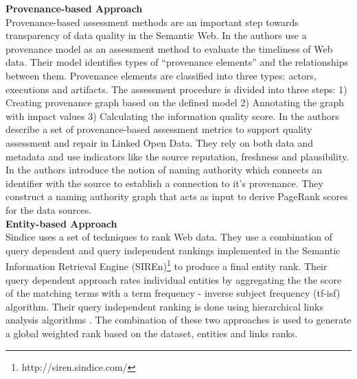 \documentclass[onecolumn, crcready]{iosart2c}
\begin{document}
{\bf Provenance-based Approach}\\

Provenance-based assessment methods are an important step towards transparency of data quality in the Semantic Web. In \cite{Hartig09usingweb} the authors use a provenance model as an assessment method to evaluate the timeliness of Web data. Their model identifies types of ``provenance elements'' and the relationships between them. Provenance elements are classified into three types: actors, executions and artifacts. The assessment procedure is divided into three steps: 1) Creating provenance graph based on the defined model 2) Annotating the graph with impact values 3) Calculating the information quality score. In \cite{Flouris2012} the authors describe a set of provenance-based assessment metrics to support quality assessment and repair in Linked Open Data. They rely on both data and metadata and use indicators like the source reputation, freshness and plausibility. In \cite{Harth2009} the authors introduce the notion of naming authority which connects an identifier with the source to establish a connection to it's provenance. They construct a naming authority graph that acts as input to derive PageRank scores for the data sources.\\

{\bf Entity-based Approach}\\

Sindice \cite{Delbru2010} uses a set of techniques to rank Web data. They use a combination of query dependent and query independent rankings implemented in the Semantic Information Retrieval Engine (SIREn)\footnote{http://siren.sindice.com/} to produce a final entity rank. Their query dependent approach rates individual entities by aggregating the the score of the matching terms with a term frequency - inverse subject frequency (tf-isf) algorithm. Their query independent ranking is done using hierarchical links analysis algorithms \cite{Delbru2010a}. The combination of these two approaches is used to generate a global weighted rank based on the dataset, entities and links ranks. \\
\end{document}
